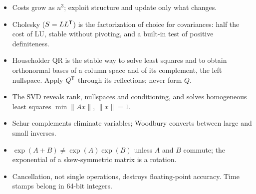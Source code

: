 \begin{takeaways}
\begin{itemize}
  \item Costs grow as $n^3$; exploit structure and update only what changes.
  \item Cholesky ($S = LL^{\mathsf{T}}$) is the factorization of choice for covariances: half the cost of LU, stable without pivoting, and a built-in test
        of positive definiteness.
  \item Householder QR is the stable way to solve least squares and to obtain orthonormal bases of a column space and of its complement,
        the left nullspace. Apply $Q^{\mathsf{T}}$ through its reflections; never form $Q$.
  \item The SVD reveals rank, nullspaces and conditioning, and solves homogeneous least squares $\min\|Ax\|$, $\|x\| = 1$.
  \item Schur complements eliminate variables; Woodbury converts between large and small inverses.
  \item $\exp(A + B) \neq \exp(A)\exp(B)$ unless $A$ and $B$ commute; the exponential of a skew-symmetric matrix is a rotation.
  \item Cancellation, not single operations, destroys floating-point accuracy. Time stamps belong in 64-bit integers.
\end{itemize}
\end{takeaways}

